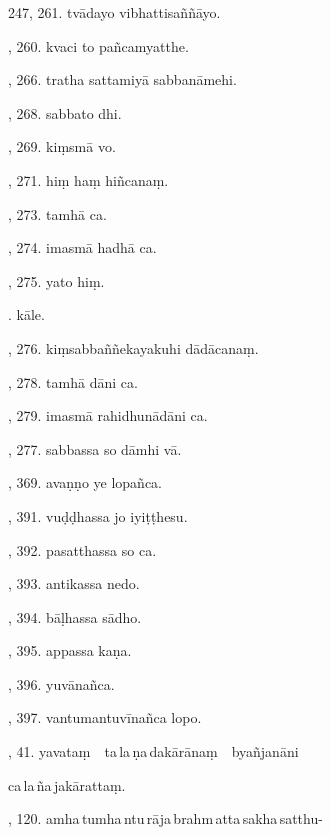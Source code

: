 247, 261. tvādayo vibhattisaññāyo.\hfill \pageref{sut:247}\par {}, 260. kvaci to pañcamyatthe.\hfill \pageref{sut:248}\par {}, 266. tratha sattamiyā sabbanāmehi.\hfill \pageref{sut:249}\par {}, 268. sabbato dhi.\hfill \pageref{sut:250}\par {}, 269. kiṃsmā vo.\hfill \pageref{sut:251}\par {}, 271. hiṃ haṃ hiñcanaṃ.\hfill \pageref{sut:252}\par {}, 273. tamhā ca.\hfill \pageref{sut:253}\par {}, 274. imasmā hadhā ca.\hfill \pageref{sut:254}\par {}, 275. yato hiṃ.\hfill \pageref{sut:255}\par {}. kāle.\hfill \pageref{sut:256}\par {}, 276. kiṃsabbaññekayakuhi dādācanaṃ.\hfill \pageref{sut:257}\par {}, 278. tamhā dāni ca.\hfill \pageref{sut:258}\par {}, 279. imasmā rahidhunādāni ca.\hfill \pageref{sut:259}\par {}, 277. sabbassa so dāmhi vā.\hfill \pageref{sut:260}\par {}, 369. avaṇṇo ye lopañca.\hfill \pageref{sut:261}\par {}, 391. vuḍḍhassa jo iyiṭṭhesu.\hfill \pageref{sut:262}\par {}, 392. pasatthassa so ca.\hfill \pageref{sut:263}\par {}, 393. antikassa nedo.\hfill \pageref{sut:264}\par {}, 394. bāḷhassa sādho.\hfill \pageref{sut:265}\par {}, 395. appassa kaṇa.\hfill \pageref{sut:266}\par {}, 396. yuvānañca.\hfill \pageref{sut:267}\par {}, 397. vantumantuvīnañca lopo.\hfill \pageref{sut:268}\par {}, 41. yavataṃ\ \ ta\,la\,ṇa\,dakārānaṃ\ \ byañjanāni\par \noindent
\hspace{15mm} ca\,la\,ña\,jakārattaṃ.\hfill \pageref{sut:269}\par {}, 120. amha\,tumha\,ntu\,rāja\,brahm\,atta\,sakha\,satthu-\par \noindent

